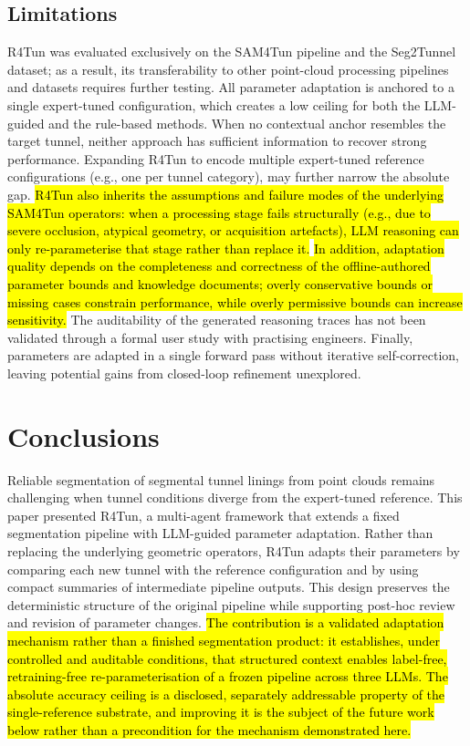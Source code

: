 \documentclass[a4paper,fleqn]{cas-dc}
\begin{document}
{\subsection{Limitations}\label{sec:limitations}

R4Tun was evaluated exclusively on the SAM4Tun pipeline and the Seg2Tunnel dataset; as a result, its transferability to other point-cloud processing pipelines and datasets requires further testing. All parameter adaptation is anchored to a single expert-tuned configuration, which creates a low ceiling for both the LLM-guided and the rule-based methods. When no contextual anchor resembles the target tunnel, neither approach has sufficient information to recover strong performance. Expanding R4Tun to encode multiple expert-tuned reference configurations (e.g., one per tunnel category), may further narrow the absolute gap. \hl{R4Tun also inherits the assumptions and failure modes of the underlying SAM4Tun operators: when a processing stage fails structurally (e.g., due to severe occlusion, atypical geometry, or acquisition artefacts), LLM reasoning can only re-parameterise that stage rather than replace it.} \hl{In addition, adaptation quality depends on the completeness and correctness of the offline-authored parameter bounds and knowledge documents; overly conservative bounds or missing cases constrain performance, while overly permissive bounds can increase sensitivity.} The auditability of the generated reasoning traces has not been validated through a formal user study with practising engineers. Finally, parameters are adapted in a single forward pass without iterative self-correction, leaving potential gains from closed-loop refinement unexplored.

\section{Conclusions}\label{sec:conclusions}

Reliable segmentation of segmental tunnel linings from point clouds remains challenging when tunnel conditions diverge from the expert-tuned reference. This paper presented R4Tun, a multi-agent framework that extends a fixed segmentation pipeline with LLM-guided parameter adaptation. Rather than replacing the underlying geometric operators, R4Tun adapts their parameters by comparing each new tunnel with the reference configuration and by using compact summaries of intermediate pipeline outputs. This design preserves the deterministic structure of the original pipeline while supporting post-hoc review and revision of parameter changes. \hl{The contribution is a validated adaptation mechanism rather than a finished segmentation product: it establishes, under controlled and auditable conditions, that structured context enables label-free, retraining-free re-parameterisation of a frozen pipeline across three LLMs. The absolute accuracy ceiling is a disclosed, separately addressable property of the single-reference substrate, and improving it is the subject of the future work below rather than a precondition for the mechanism demonstrated here.}

}
\end{document}
